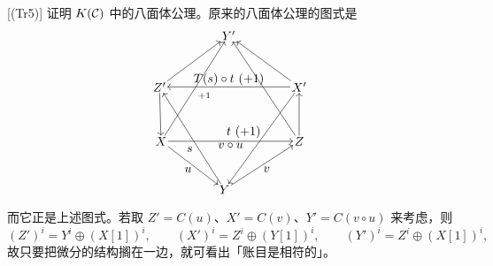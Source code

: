 [(Tr5)] 证明 $K(\mathcal{C})$ 中的八面体公理。原来的八面体公理的图式是
\[
\begin{tikzpicture}[scale=0.92, every node/.style={inner sep=1pt}]
\node (Yp) at (0,2.66) {$Y'$};
\node (Zp) at (-2.13,1.06) {$Z'$};
\node (Xp) at (2.17,1.06) {$X'$};
\node (X)  at (-2.08,-0.63) {$X$};
\node (Z)  at (2.17,-0.63) {$Z$};
\node (Y)  at (-0.13,-2.13) {$Y$};
\draw[->] (Zp) -- (Yp);
\draw[->] (X)  -- (Yp);
\draw[->] (Xp) -- (Yp);
\draw[->] (Z)  -- (Yp);
\draw[->] (Xp) -- node[above] {$T(s)\circ t\ (+1)$} (Zp);
\draw[->] (Zp) -- (X);
\draw[->] (Z)  -- (Xp);
\draw[->] (X)  -- node[below] {$v\circ u$} (Z);
\draw[->] (X)  -- node[below left] {$u$} (Y);
\draw[->] (Y)  -- node[below right] {$v$} (Z);
\draw[->] (Y)  -- (Zp);
\draw[->] (Xp) -- (Y);
\node at (-1.20,-0.88) {$s$};
\node at (0.46,-0.34) {$t\ (+1)$};
\node at (-0.75,0.78) {$\scriptstyle +1$};
\end{tikzpicture}
\]
而它正是上述图式。若取 $Z'=C(u)$、$X'=C(v)$、$Y'=C(v\circ u)$ 来考虑，则
\[
(Z')^i = Y^i\oplus(X[1])^i,\qquad (X')^i = Z^i\oplus(Y[1])^i,\qquad (Y')^i = Z^i\oplus(X[1])^i,
\]
故只要把微分的结构搁在一边，就可看出「账目是相符的」。

